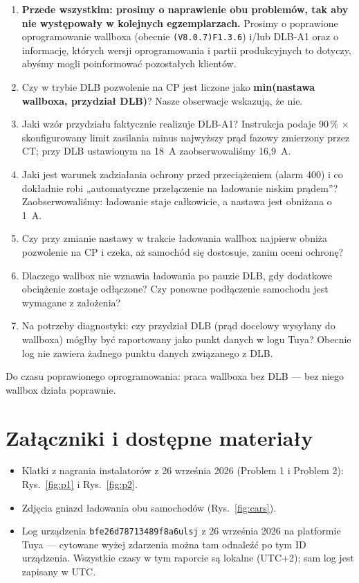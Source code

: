 \documentclass[11pt,a4paper]{article}
\begin{document}
\begin{enumerate}
\item \textbf{Przede wszystkim: prosimy o naprawienie obu problemów, tak aby nie występowały w kolejnych egzemplarzach.} Prosimy o poprawione oprogramowanie wallboxa (obecnie \texttt{(V8.0.7)F1.3.6}) i/lub DLB-A1 oraz o informację, których wersji oprogramowania i partii produkcyjnych to dotyczy, abyśmy mogli poinformować pozostałych klientów.
\item Czy w trybie DLB pozwolenie na CP jest liczone jako \textbf{min(nastawa wallboxa, przydział DLB)}? Nasze obserwacje wskazują, że nie.
\item Jaki wzór przydziału faktycznie realizuje DLB-A1? Instrukcja podaje 90\,\% $\times$ skonfigurowany limit zasilania minus najwyższy prąd fazowy zmierzony przez CT; przy DLB ustawionym na 18~A zaobserwowaliśmy 16,9~A.
\item Jaki jest warunek zadziałania ochrony przed przeciążeniem (alarm 400) i co dokładnie robi „automatyczne przełączenie na ładowanie niskim prądem”? Zaobserwowaliśmy: ładowanie staje całkowicie, a nastawa jest obniżana o 1~A.
\item Czy przy zmianie nastawy w trakcie ładowania wallbox najpierw obniża pozwolenie na CP i czeka, aż samochód się dostosuje, zanim oceni ochronę?
\item Dlaczego wallbox nie wznawia ładowania po pauzie DLB, gdy dodatkowe obciążenie zostaje odłączone? Czy ponowne podłączenie samochodu jest wymagane z założenia?
\item Na potrzeby diagnostyki: czy przydział DLB (prąd docelowy wysyłany do wallboxa) mógłby być raportowany jako punkt danych w logu Tuya? Obecnie log nie zawiera żadnego punktu danych związanego z DLB.
\end{enumerate}

\begin{apgreenb}
Do czasu poprawionego oprogramowania: praca wallboxa bez DLB — bez niego wallbox działa poprawnie.
\end{apgreenb}

\section{Załączniki i dostępne materiały}

\begin{itemize}
\item Klatki z nagrania instalatorów z 26 września 2026 (Problem 1 i Problem 2): Rys.~\ref{fig:p1} i Rys.~\ref{fig:p2}.
\item Zdjęcia gniazd ładowania obu samochodów (Rys.~\ref{fig:cars}).
\item Log urządzenia \texttt{bfe26d78713489f8a6ulsj} z 26 września 2026 na platformie Tuya — cytowane wyżej zdarzenia można tam odnaleźć po tym ID urządzenia. Wszystkie czasy w tym raporcie są lokalne (UTC+2); sam log jest zapisany w UTC.
\end{itemize}
\end{document}
